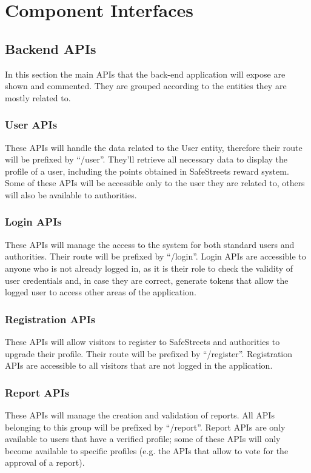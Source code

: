 \section{Component Interfaces}

\subsection{Backend APIs}
In this section the main APIs that the back-end application will expose are shown and commented. They are grouped according to the entities they are mostly related to.

\subsubsection{User APIs}
These APIs will handle the data related to the User entity, therefore their route will be prefixed by “/user”. They'll retrieve all necessary data to display the profile of a user, including the points obtained in SafeStreets reward system. Some of these APIs will be accessible only to the user they are related to, others will also be available to authorities.

\subsubsection{Login APIs}
These APIs will manage the access to the system for both standard users and authorities. Their route will be prefixed by “/login”. Login APIs are accessible to anyone who is not already logged in, as it is their role to check the validity of user credentials and, in case they are correct, generate tokens that allow the logged user to access other areas of the application.

\subsubsection{Registration APIs}
These APIs will allow visitors to register to SafeStreets and authorities to upgrade their profile. Their route will be prefixed by “/register”. Registration APIs are accessible to all visitors that are not logged in the application.

\subsubsection{Report APIs}
These APIs will manage the creation and validation of reports. All APIs belonging to this group will be prefixed by “/report”. Report APIs are only available to users that have a verified profile; some of these APIs will only become available to specific profiles (e.g. the APIs that allow to vote for the approval of a report).

